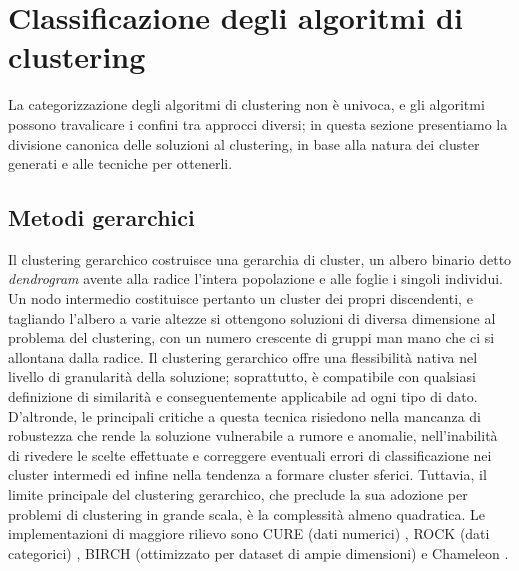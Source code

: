 \section{Classificazione degli algoritmi di clustering}
\label{sec:classificazione_algoritmi}
La categorizzazione degli algoritmi di clustering non \`e univoca, e gli algoritmi possono travalicare i confini tra approcci diversi; in questa sezione presentiamo la divisione canonica delle soluzioni al clustering, in base alla natura dei cluster generati e alle tecniche per ottenerli.
\subsection{Metodi gerarchici}
Il clustering gerarchico costruisce una gerarchia di cluster, un albero binario detto \textit{dendrogram} avente alla radice l'intera popolazione e alle foglie i singoli individui. Un nodo intermedio costituisce pertanto un cluster dei propri discendenti, e tagliando l'albero a varie altezze si ottengono soluzioni di diversa dimensione al problema del clustering, con un numero crescente di gruppi man mano che ci si allontana dalla radice.
Il clustering gerarchico offre una flessibilit\`a nativa nel livello di granularit\`a della soluzione; soprattutto, \`e  compatibile con qualsiasi definizione di similarit\`a e conseguentemente applicabile ad ogni tipo di dato. D'altronde, le principali critiche a questa tecnica risiedono nella mancanza di robustezza che rende la soluzione vulnerabile a rumore e anomalie, nell'inabilit\`a di rivedere le scelte effettuate e correggere eventuali errori di classificazione nei cluster intermedi ed infine nella tendenza a formare cluster sferici. Tuttavia, il limite principale del clustering gerarchico, che preclude la sua adozione per problemi di clustering in grande scala, \`e la complessit\`a almeno quadratica. Le implementazioni di maggiore rilievo sono CURE (dati numerici) \cite{cure}, ROCK (dati categorici) \cite{rock}, BIRCH (ottimizzato per dataset di ampie dimensioni) \cite{birch} e Chameleon \cite{chameleon}.
